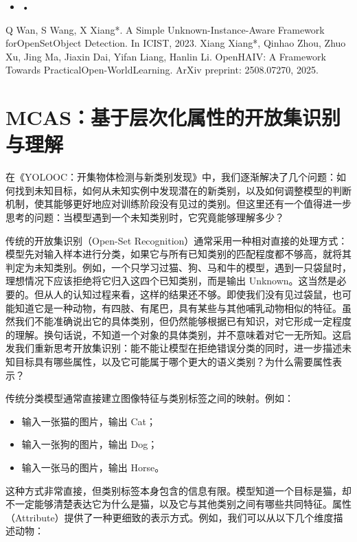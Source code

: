 \begin{itemize}
  \item •
\end{itemize}

Q Wan, S Wang, X Xiang*. A Simple Unknown-Instance-Aware Framework forOpenSetObject Detection. In ICIST, 2023. Xiang Xiang*, Qinhao Zhou, Zhuo Xu, Jing Ma, Jiaxin Dai, Yifan Liang, Hanlin Li. OpenHAIV: A Framework Towards PracticalOpen-WorldLearning. ArXiv preprint: 2508.07270, 2025.

\section{MCAS：基于层次化属性的开放集识别与理解}

在《YOLOOC：开集物体检测与新类别发现》中，我们逐渐解决了几个问题：如何找到未知目标，如何从未知实例中发现潜在的新类别，以及如何调整模型的判断机制，使其能够更好地应对训练阶段没有见过的类别。但这里还有一个值得进一步思考的问题：当模型遇到一个未知类别时，它究竟能够理解多少？

传统的开放集识别（Open-Set Recognition）通常采用一种相对直接的处理方式：模型先对输入样本进行分类，如果它与所有已知类别的匹配程度都不够高，就将其判定为未知类别。例如，一个只学习过猫、狗、马和牛的模型，遇到一只袋鼠时，理想情况下应该拒绝将它归入这四个已知类别，而是输出 Unknown。这当然是必要的。但从人的认知过程来看，这样的结果还不够。即使我们没有见过袋鼠，也可能知道它是一种动物，有四肢、有尾巴，具有某些与其他哺乳动物相似的特征。虽然我们不能准确说出它的具体类别，但仍然能够根据已有知识，对它形成一定程度的理解。换句话说，不知道一个对象的具体类别，并不意味着对它一无所知。这启发我们重新思考开放集识别：能不能让模型在拒绝错误分类的同时，进一步描述未知目标具有哪些属性，以及它可能属于哪个更大的语义类别？为什么需要属性表示？

传统分类模型通常直接建立图像特征与类别标签之间的映射。例如：

\begin{itemize}
  \item 输入一张猫的图片，输出 Cat；
  \item 输入一张狗的图片，输出 Dog；
  \item 输入一张马的图片，输出 Horse。
\end{itemize}

这种方式非常直接，但类别标签本身包含的信息有限。模型知道一个目标是猫，却不一定能够清楚表达它为什么是猫，以及它与其他类别之间有哪些共同特征。属性（Attribute）提供了一种更细致的表示方式。例如，我们可以从以下几个维度描述动物：

